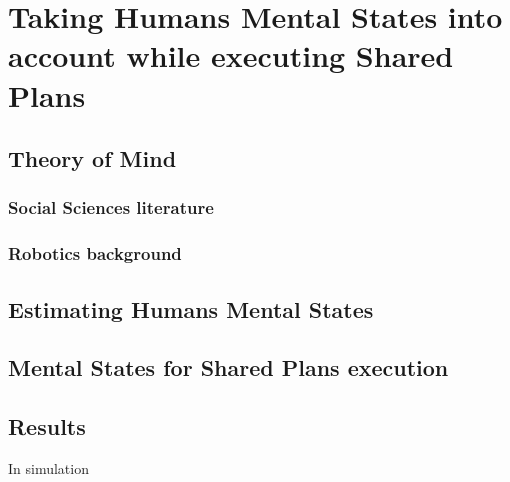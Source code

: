 \documentclass[english,a4paper,11pt,twoside]{StyleThese}
\begin{document}
\setcounter{chapter}{2} %
\dominitoc
\faketableofcontents
\fi

\chapter{Taking Humans Mental States into account while executing Shared Plans}
\minitoc

\section{Theory of Mind}
\subsection{Social Sciences literature}
\subsection{Robotics background}

\section{Estimating Humans Mental States}

\section{Mental States for Shared Plans execution}

\section{Results}

In simulation

\ifdefined{}
\else


\end{document}
